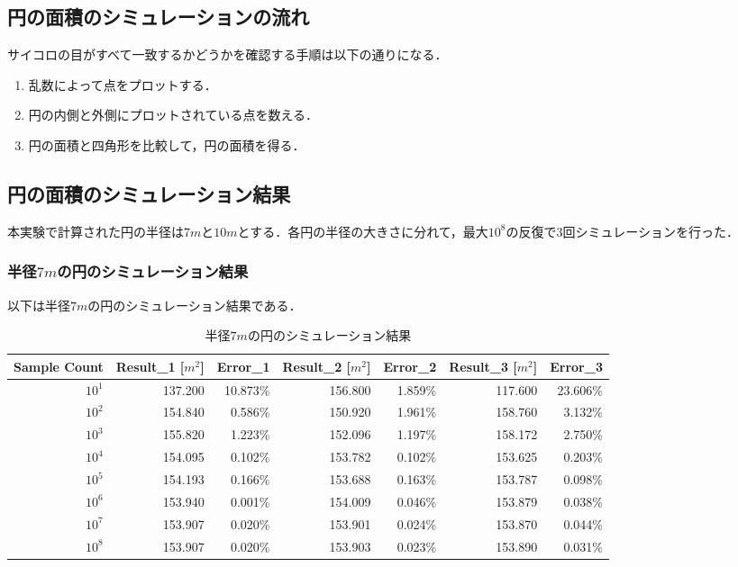 \documentclass[a4j, titlepage]{jarticle}
\begin{document}
    \subsection{円の面積のシミュレーションの流れ}
      サイコロの目がすべて一致するかどうかを確認する手順は以下の通りになる．
      \begin{screen}
        \begin{enumerate}
          \item 乱数によって点をプロットする．
          \item 円の内側と外側にプロットされている点を数える．
          \item 円の面積と四角形を比較して，円の面積を得る．
        \end{enumerate}
      \end{screen}

    \subsection{円の面積のシミュレーション結果}
      本実験で計算された円の半径は$7m$と$10m$とする．各円の半径の大きさに分れて，最大$10^8$の反復で$3$回シミュレーションを行った．

      \subsubsection{半径$7m$の円のシミュレーション結果}
        以下は半径$7m$の円のシミュレーション結果である．

        \begin{longtable}[c]{|r|r|r|r|r|r|r|}
          \caption{半径$7m$の円のシミュレーション結果}
          \label{tab:area7}\\
          \hline
          \rowcolor[HTML]{C0C0C0} 
          Sample Count    & Result\_1 [$m^2$] & Error\_1 & Result\_2 [$m^2$] & Error\_2 & Result\_3 [$m^2$] & Error\_3 \\ \hline
          \endfirsthead
          \endhead
          $10^1$    & 137.200   & 10.873\% & 156.800   & 1.859\%  & 117.600   & 23.606\% \\ \hline
          $10^2$    & 154.840   & 0.586\%  & 150.920   & 1.961\%  & 158.760   & 3.132\%  \\ \hline
          $10^3$    & 155.820   & 1.223\%  & 152.096   & 1.197\%  & 158.172   & 2.750\%  \\ \hline
          $10^4$    & 154.095   & 0.102\%  & 153.782   & 0.102\%  & 153.625   & 0.203\%  \\ \hline
          $10^5$    & 154.193   & 0.166\%  & 153.688   & 0.163\%  & 153.787   & 0.098\%  \\ \hline
          $10^6$    & 153.940   & 0.001\%  & 154.009   & 0.046\%  & 153.879   & 0.038\%  \\ \hline
          $10^7$    & 153.907   & 0.020\%  & 153.901   & 0.024\%  & 153.870   & 0.044\%  \\ \hline
          $10^8$    & 153.907   & 0.020\%  & 153.903   & 0.023\%  & 153.890   & 0.031\%  \\ \hline
        \end{longtable}
        
\end{document}
